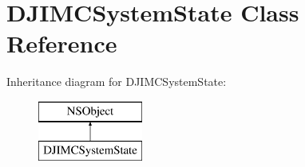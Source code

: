 \hypertarget{interface_d_j_i_m_c_system_state}{\section{D\+J\+I\+M\+C\+System\+State Class Reference}
\label{interface_d_j_i_m_c_system_state}
}
Inheritance diagram for D\+J\+I\+M\+C\+System\+State\+:\begin{figure}[H]
\begin{center}
\leavevmode
\includegraphics[height=2.000000cm]{interface_d_j_i_m_c_system_state}
\end{center}
\end{figure}
